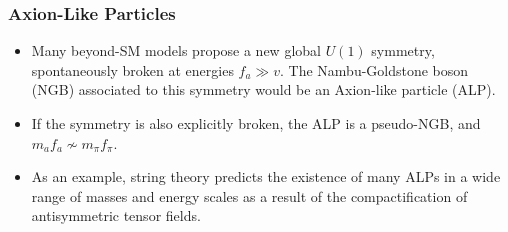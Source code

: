 \documentclass[mathserif, 10pt, aspectratio=169]{beamer}
\begin{document}
\begin{frame}\frametitle{Axion-Like Particles}
    \begin{itemize}\setlength{\itemsep}{15pt}
        \item Many beyond-SM models propose a new global $U(1)$ symmetry, spontaneously broken at energies $f_a \gg v$. The Nambu-Goldstone boson (NGB) associated to this symmetry would be an Axion-like particle (ALP).
        \item If the symmetry is also explicitly broken, the ALP is a pseudo-NGB, and $m_a f_a \nsim m_\pi f_\pi$.
        \item As an example, string theory predicts the existence of many ALPs in a wide range of masses and energy scales as a result of the compactification of antisymmetric tensor fields.
    \end{itemize}
\end{frame}
\end{document}
